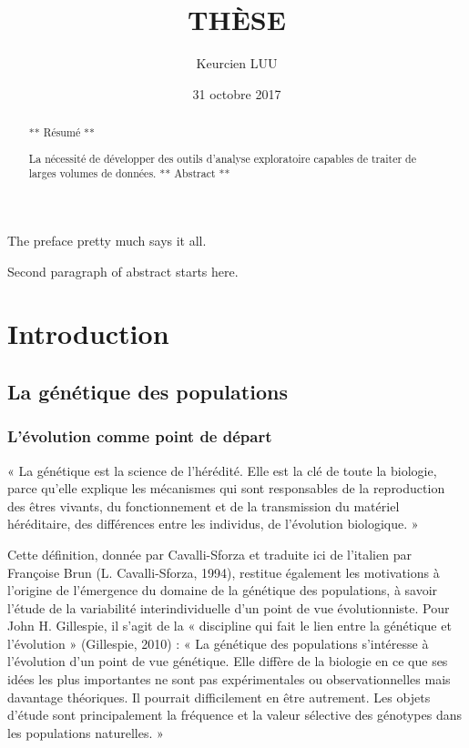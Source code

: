 \documentclass[12pt,a4paper,twoside]{ugathesis}
\title{THÈSE}
\author{Keurcien LUU}
\date{31 octobre 2017}
\theoremstyle{definition}
\theoremstyle{definition}
\theoremstyle{remark}
\begin{document}
  \maketitle

\frontmatter %
\pagestyle{empty} %
  \begin{acknowledgements}
    The preface pretty much says it all. \par  Second paragraph of abstract
    starts here.
  \end{acknowledgements}

  \hypersetup{linkcolor=black}
  \setcounter{tocdepth}{2}
  \tableofcontents

  \listoftables

  \begin{abstract}
    ** Résumé ** \par  La nécessité de développer des outils d'analyse
    exploratoire capables de traiter de larges volumes de données. **
    Abstract **
  \end{abstract}

\mainmatter %
\pagestyle{fancyplain} %

\chapter{Introduction}\label{introduction}

\section{La génétique des
populations}\label{la-genetique-des-populations}

\subsection{L'évolution comme point de
départ}\label{levolution-comme-point-de-depart}

« La génétique est la science de l'hérédité. Elle est la clé de toute la
biologie, parce qu'elle explique les mécanismes qui sont responsables de
la reproduction des êtres vivants, du fonctionnement et de la
transmission du matériel héréditaire, des différences entre les
individus, de l'évolution biologique. »

Cette définition, donnée par Cavalli-Sforza et traduite ici de l'italien
par Françoise Brun (L. Cavalli-Sforza, 1994), restitue également les
motivations à l'origine de l'émergence du domaine de la génétique des
populations, à savoir l'étude de la variabilité interindividuelle d'un
point de vue évolutionniste. Pour John H. Gillespie, il s'agit de la «
discipline qui fait le lien entre la génétique et l'évolution »
(Gillespie, 2010) : « La génétique des populations s'intéresse à
l'évolution d'un point de vue génétique. Elle diffère de la biologie en
ce que ses idées les plus importantes ne sont pas expérimentales ou
observationnelles mais davantage théoriques. Il pourrait difficilement
en être autrement. Les objets d'étude sont principalement la fréquence
et la valeur sélective des génotypes dans les populations naturelles. »
\end{document}
